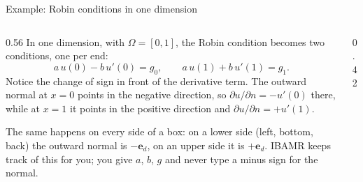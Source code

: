 \documentclass[aspectratio=169,11pt]{beamer}
\begin{document}
\begin{frame}{Example: Robin conditions in one dimension}
\label{fr:oned}
\begin{columns}[T,onlytextwidth]
\begin{column}{0.56\textwidth}
\small In one dimension, with $\Omega = [0,1]$, the Robin condition becomes two conditions, one per end:
\[
  a\,u(0) - b\,u'(0) = g_0, \qquad a\,u(1) + b\,u'(1) = g_1 .
\]
Notice the change of sign in front of the derivative term. The outward normal at $x = 0$ points in the negative direction, so $\partial u/\partial n = -u'(0)$ there, while at $x = 1$ it points in the positive direction and $\partial u/\partial n = +u'(1)$.
\vspace{1mm}

\small The same happens on every side of a box: on a lower side (left, bottom, back) the outward normal is $-\mathbf{e}_d$, on an upper side it is $+\mathbf{e}_d$. IBAMR keeps track of this for you; you give $a$, $b$, $g$ and never type a minus sign for the normal.
\end{column}
\begin{column}{0.42\textwidth}
\end{column}
\end{columns}
\end{frame}
\end{document}
